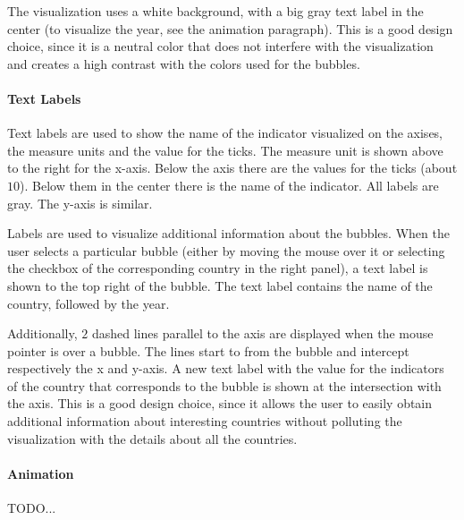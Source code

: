 The visualization uses a white background, with a big gray text label in the center (to visualize the year, see the animation paragraph).
This is a good design choice, since it is a neutral color that does not interfere with the visualization and creates a high contrast with the colors used for the bubbles.


\paragraph{Text Labels}
Text labels are used to show the name of the indicator visualized on the axises, the measure units and the value for the ticks.
The measure unit is shown above to the right for the x-axis.
Below the axis there are the values for the ticks (about $10$).
Below them in the center there is the name of the indicator.
All labels are gray.
The y-axis is similar.


Labels are used to visualize additional information about the bubbles.
When the user selects a particular bubble (either by moving the mouse over it or selecting the checkbox of the corresponding country in the right panel), a text label is shown to the top right of the bubble.
The text label contains the name of the country, followed by the year.

Additionally, $2$ dashed lines parallel to the axis are displayed when the mouse pointer is over a bubble.
The lines start to from the bubble and intercept respectively the x and y-axis.
A new text label with the value for the indicators of the country that corresponds to the bubble is shown at the intersection with the axis.
This is a good design choice, since it allows the user to easily obtain additional information about interesting countries without polluting the visualization with the details about all the countries.

\paragraph{Animation}
TODO...

